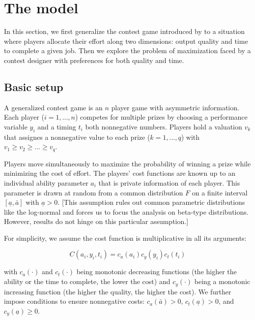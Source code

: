 \documentclass[12pt,]{article}
\theoremstyle{plain} %
\newcommand\lotype{\underline{a}}
\newcommand\hitype{\bar{a}}
\begin{document}
\section{The model}\label{the-model}

In this section, we first generalize the contest game introduced by
\citet{moldovanu2001optimal} to a situation where players allocate their
effort along two dimensions: output quality and time to complete a given
job. Then we explore the problem of maximization faced by a contest
designer with preferences for both quality and time.

\subsection{Basic setup}\label{basic-setup}

A generalized contest game is an \(n\) player game with asymmetric
information. Each player (\(i=1,..., n\)) competes for multiple prizes
by choosing a performance variable \(y_i\) and a timing \(t_i\) both
nonnegative numbers. Players hold a valuation \(v_k\) that assignes a
nonnegative value to each prize (\(k=1, ..., q\)) with
\(v_1\geq v_2\geq ...\geq v_q\).

Players move simultaneously to maximize the probability of winning a
prize while minimizing the cost of effort. The players' cost functions
are known up to an individual ability parameter \(a_i\) that is private
information of each player. This parameter is drawn at random from a
common distribution \(F\) on a finite interval \([\lotype, \hitype]\)
with \(\lotype>0\). {[}This assumption rules out common parametric
distributions like the log-normal and forces us to focus the analysis on
beta-type distributions. However, results do not hinge on this
particular assumption.{]}

For simplicity, we assume the cost function is multiplicative in all its
arguments:

\begin{equation}
  C(a_i, y_i, t_i) = c_a(a_i) c_y(y_i) c_t(t_i)
\end{equation}

with \(c_a(\cdot)\) and \(c_t(\cdot)\) being monotonic decreasing
functions (the higher the ability or the time to complete, the lower the
cost) and \(c_{y}(\cdot)\) being a monotonic increasing function (the
higher the quality, the higher the cost). We further impose conditions
to ensure nonnegative costs: \(c_{a}(\hitype)>0\), \(c_{t}(\lotype)>0\),
and \(c_{y}(\lotype)\geq 0\).
\end{document}
